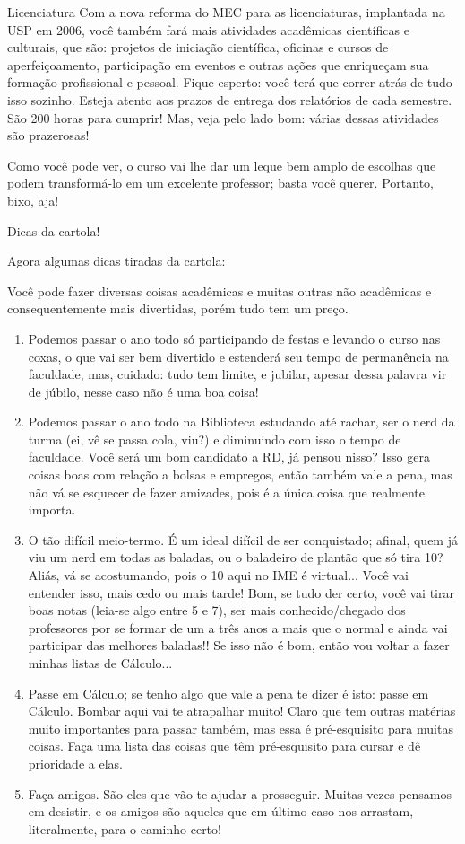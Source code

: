 \begin{subsecao}{Licenciatura}
Com a nova reforma do MEC para as licenciaturas, implantada na USP em 2006,
você também fará mais atividades acadêmicas científicas e culturais, que são:
projetos de iniciação científica, oficinas e cursos de aperfeiçoamento,
participação em eventos e outras ações que enriqueçam sua formação
profissional e pessoal. Fique esperto: você terá que correr atrás de tudo isso
sozinho. Esteja atento aos prazos de entrega dos relatórios de cada
semestre. São 200 horas para cumprir! Mas, veja pelo lado bom: várias dessas
atividades são prazerosas!

Como você pode ver, o curso vai lhe dar um leque bem amplo de escolhas que podem
transformá-lo em um excelente professor; basta você querer. Portanto, bixo, aja!

\begin{subsubsecao}{Dicas da cartola!}

Agora algumas dicas tiradas da cartola:

Você pode fazer diversas coisas acadêmicas e muitas outras não acadêmicas e
consequentemente mais divertidas, porém tudo tem um preço.
\begin{enumerate}
\item	Podemos passar o ano todo só participando de festas e levando o curso nas
coxas, o que vai ser bem divertido e estenderá seu tempo de permanência  na
faculdade, mas, cuidado: tudo tem limite, e jubilar, apesar dessa palavra vir
de júbilo, nesse caso não é uma boa coisa!
\item	Podemos passar o ano todo na Biblioteca estudando até rachar, ser o nerd
da turma (ei, vê se passa cola, viu?) e diminuindo com isso o tempo de
faculdade. Você será um bom candidato a RD, já pensou nisso? Isso gera coisas
boas com relação a bolsas e empregos, então também vale a pena, mas não vá se
esquecer de fazer amizades, pois é a única coisa que realmente importa.
\item	O tão difícil meio-termo. É um ideal difícil de ser conquistado; afinal,
quem já viu um nerd em todas as baladas, ou o baladeiro de plantão que só
tira 10? Aliás, vá se acostumando, pois o 10 aqui no IME é virtual... Você vai
entender isso, mais cedo ou mais tarde! Bom, se tudo der certo, você vai tirar
boas notas (leia-se algo entre 5 e 7), ser mais conhecido/chegado dos
professores por se formar de um a três anos a mais que o normal e ainda vai
participar das melhores baladas!! Se isso não é bom, então vou voltar a fazer
minhas listas de Cálculo...
\item	Passe em Cálculo; se tenho algo que vale a pena te dizer é isto: passe em
Cálculo. Bombar aqui vai te atrapalhar muito! Claro que tem outras matérias
muito importantes para passar também, mas essa é pré-esquisito para muitas
coisas. Faça uma lista das coisas que têm pré-esquisito para cursar e dê
prioridade a elas.
\item	Faça amigos. São eles que vão te ajudar a prosseguir. Muitas vezes
pensamos em desistir, e os amigos são aqueles que em último caso nos arrastam,
literalmente, para o caminho certo!


\end{enumerate}
\end{subsubsecao}
\end{subsecao}
